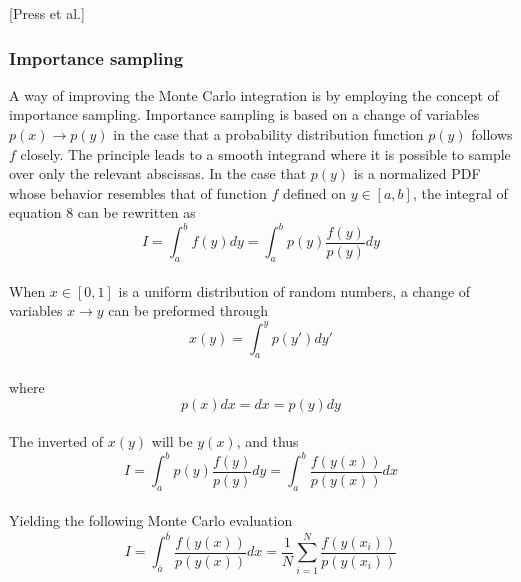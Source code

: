 \documentclass[%
reprint,nofootinbib,
amsmath,amssymb,
aps,
]{revtex4-1}
\begin{document}
\hspace{6cm}[Press et al.] 


\subsubsection{Importance sampling} \noindent 
A way of improving the Monte Carlo integration is by employing the concept of importance sampling. Importance sampling is based on a change of variables $p(x)\rightarrow p(y)$ in the case that a probability distribution function $p(y)$ follows $f$ closely. The principle leads to a smooth integrand where it is possible to sample over only the relevant abscissas. In the case that $p(y)$ is a normalized PDF whose behavior resembles that of function $f$ defined on $y\in[a, b]$, the integral of equation 8 can be rewritten as  \\
\begin{equation*}
	I = \int_{a}^{b}f(y)dy = \int_{a}^{b}p(y)\dfrac{f(y)}{p(y)}dy 
\end{equation*}\vspace{2mm} \\
When $x\in[0,1]$ is a uniform distribution of random numbers, a change of variables $x\rightarrow y$ can be preformed through\vspace{2mm} \\
\begin{equation*}
	x(y) = \int_{a}^{y}p(y')dy'
\end{equation*} \\
where\vspace{2mm} \\
\begin{equation*}
	p(x)dx = dx = p(y)dy
\end{equation*}\vspace{2mm} \\
The inverted of $x(y)$ will be $y(x)$, and thus\vspace{2mm} \\
\begin{equation*}
I = \int_{a}^{b}p(y)\dfrac{f(y)}{p(y)}dy  = \int_{a}^{b}\dfrac{f(y(x))}{p(y(x))}dx
\end{equation*}\vspace{2mm} \\
Yielding the following Monte Carlo evaluation \vspace{2mm} \\
\begin{equation}\label{mcis}
	I = \int_{\bar{a}}^{\bar{b}}\dfrac{f(y(x))}{p(y(x))}dx = \dfrac{1}{N}\sum_{i=1}^{N}\dfrac{f(y(x_i))}{p(y(x_i))}
\end{equation}\vspace{2mm} \\
\end{document}
